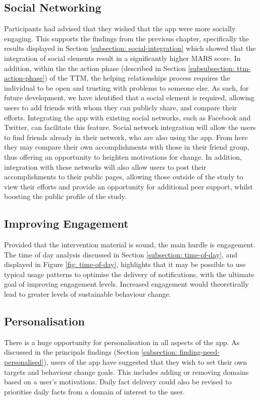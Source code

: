 \subsection{Social Networking}
Participants had advised that they wished that the app were more socially engaging. This supports the findings from the previous chapter, specifically the results displayed in Section \ref{subsection: social-integration} which showed that the integration of social elements result in a significantly higher MARS
score.
In addition, within the the action phase (described in Section \ref{subsubsection: ttm-action-phase}) of the TTM, the helping relationships process requires the individual to be open and trusting with problems to someone else. As such, for future development, we have identified that a social element is required, allowing users to add friends with whom they can publicly share, and compare their efforts. Integrating the app with existing social networks, such as Facebook and Twitter, can facilitate this feature. Social network integration will allow the users to find friends already in their network, who are also using the app. From here they may compare their own accomplishments with those in their friend group, thus offering an opportunity to heighten motivations for change. In addition, integration with these networks will also allow users to post their accomplishments to their public pages, allowing those outside of the study to view their efforts and provide an opportunity for additional peer support, whilst boosting the public profile of the study.

\subsection{Improving Engagement}
Provided that the intervention material is sound, the main hurdle is engagement. The time of day analysis discussed in Section \ref{subsection: time-of-day}, and displayed in Figure \ref{fig: time-of-day}, highlights that it may be possible to use typical usage patterns to optimise the delivery of notifications, with the ultimate goal of improving engagement levels. Increased engagement would theoretically lead to greater levels of sustainable behaviour change.

\subsection{Personalisation} \label{subsection: gm-future-personalisation}
There is a huge opportunity for personalisation in all aspects of the app. As discussed in the principals findings (Section \ref{subsection: finding-need-personalised}), users of the app have suggested that they wish to set their own targets and behaviour change goals. This includes adding or removing domains based on a user’s motivations. Daily fact delivery could also be revised to prioritise daily facts from a domain of interest to the user.

